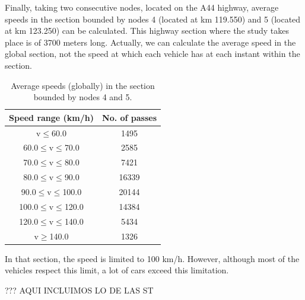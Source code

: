 \documentclass[preprint,authoryear,12pt]{elsarticle}
\begin{document}

Finally, taking two consecutive nodes, located on the A44 highway, average speeds in the section bounded by nodes 4 (located at km 119.550) and 5 (located at km 123.250) can be calculated.
This highway section where the study takes place is of 3700 meters long.
Actually, we can calculate the average speed in the global section, not the speed at which each vehicle has at each instant within the section.

 \begin{table}
 \begin{center}
 \begin{tabular}{|c|c|}
 \hline
Speed range (km/h) &  No. of passes  \\
 \hline
v$\leq$60.0	& 1495  \\
 \hline
60.0$\leq$v$\leq$70.0 & 2585  \\
 \hline
70.0$\leq$v$\leq$80.0 & 7421  \\
 \hline
80.0$\leq$v$\leq$90.0 & 16339  \\
 \hline
90.0$\leq$v$\leq$100.0 & 20144  \\
 \hline
100.0$\leq$v$\leq$120.0 & 14384  \\
 \hline
120.0$\leq$v$\leq$140.0 & 5434  \\
 \hline
v$\geq$140.0 & 1326  \\
 \hline
 \end{tabular}
 \end{center}
 \caption{Average speeds (globally) in the section bounded by nodes 4 and 5.
 \label{velocidad}}
 \end{table}


In that section, the speed is limited to 100 km/h. However, although most of the vehicles respect this limit, a lot of cars exceed this limitation.


??? AQUI INCLUIMOS LO DE LAS ST
\end{document}
